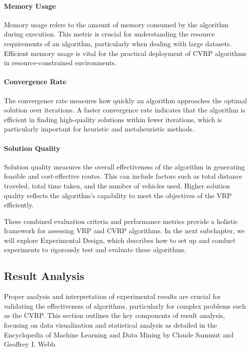 \documentclass[
]{article}
\begin{document}
    \paragraph{Memory Usage} Memory usage refers to the amount of memory consumed by the algorithm during execution. This metric is crucial for understanding the resource requirements of an algorithm, particularly when dealing with large datasets. Efficient memory usage is vital for the practical deployment of CVRP algorithms in resource-constrained environments.

    \paragraph{Convergence Rate} The convergence rate measures how quickly an algorithm approaches the optimal solution over iterations. A faster convergence rate indicates that the algorithm is efficient in finding high-quality solutions within fewer iterations, which is particularly important for heuristic and metaheuristic methods.

    \paragraph{Solution Quality} Solution quality measures the overall effectiveness of the algorithm in generating feasible and cost-effective routes. This can include factors such as total distance traveled, total time taken, and the number of vehicles used. Higher solution quality reflects the algorithm’s capability to meet the objectives of the VRP efficiently.


    These combined evaluation criteria and performance metrics provide a holistic framework for assessing VRP and CVRP algorithms. In the next subchapter, we will explore Experimental Design, which describes how to set up and conduct experiments to rigorously test and evaluate these algorithms.

    \subsection{Result Analysis}\label{subsec:result-analysis}

    Proper analysis and interpretation of experimental results are crucial for validating the effectiveness of algorithms, particularly for complex problems such as the CVRP. This section outlines the key components of result analysis, focusing on data visualization and statistical analysis as detailed in the Encyclopedia of Machine Learning and Data Mining by Claude Sammut and Geoffrey I. Webb.
\end{document}
